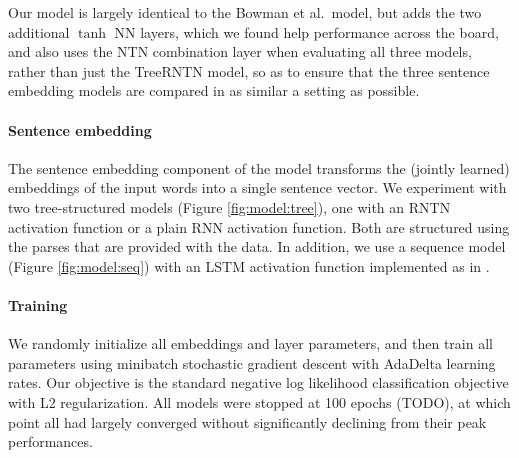 Our model is largely identical to the Bowman et al.~model, but adds the two additional $\tanh$ NN layers, which we found help performance across the board, and also uses the NTN combination layer when evaluating all three models, rather than just the TreeRNTN model, so as to ensure that the three sentence embedding models are compared in as similar a setting as possible.

\paragraph{Sentence embedding}
The sentence embedding component of the model transforms the (jointly learned) embeddings of the input words into a single sentence vector. We experiment with two tree-structured models (Figure \ref{fig:model:tree}), one with an RNTN activation function or a plain RNN activation function. Both are structured using the parses that are provided with the data. In addition, we use a sequence model (Figure \ref{fig:model:seq}) with an LSTM activation function \cite{hochreiter1997long} implemented as in .

\paragraph{Training} We randomly initialize all embeddings and layer parameters, and then train all parameters using minibatch stochastic gradient descent with AdaDelta \cite{zeiler2012adadelta} learning rates. Our objective is the standard negative log likelihood classification objective with L2 regularization. All models were stopped at 100 epochs (TODO), at which point all had largely converged without significantly declining from their peak performances.
